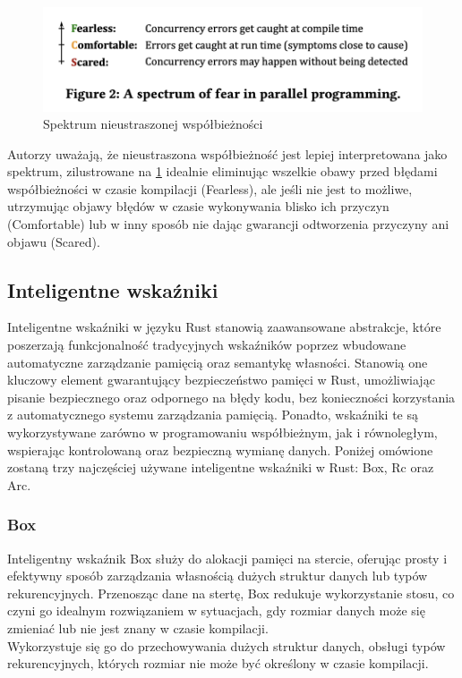 \begin{figure}[H]
    \centering
    \includegraphics[width=0.5\linewidth]{images/FearlesRustExplain.png}
    \caption{Spektrum nieustraszonej współbieżności \cite{WhenIsParallelismFearlessandZeroCostwithRust?}}
    \label{fig:FearlessSpectrum}
\end{figure}
Autorzy \cite{WhenIsParallelismFearlessandZeroCostwithRust?}
uważają, że nieustraszona współbieżność jest lepiej interpretowana jako spektrum, zilustrowane na \ref{fig:FearlessSpectrum} idealnie eliminując wszelkie obawy przed błędami współbieżności w czasie kompilacji (Fearless), ale jeśli nie jest to możliwe, utrzymując objawy błędów w czasie wykonywania blisko ich przyczyn (Comfortable) lub w inny sposób nie dając gwarancji odtworzenia przyczyny ani objawu (Scared).

\subsection{Inteligentne wskaźniki }
Inteligentne wskaźniki w języku Rust stanowią zaawansowane abstrakcje, które poszerzają funkcjonalność tradycyjnych wskaźników poprzez wbudowane automatyczne zarządzanie pamięcią oraz semantykę własności. Stanowią one kluczowy element gwarantujący bezpieczeństwo pamięci w Rust, umożliwiając pisanie bezpiecznego oraz odpornego na błędy kodu, bez konieczności korzystania z automatycznego systemu zarządzania pamięcią. Ponadto, wskaźniki te są wykorzystywane zarówno w programowaniu współbieżnym, jak i równoległym, wspierając kontrolowaną oraz bezpieczną wymianę danych. Poniżej omówione zostaną trzy najczęściej używane inteligentne wskaźniki w Rust: Box, Rc oraz Arc.

\subsubsection{Box}
\label{BOX}
Inteligentny wskaźnik Box służy do alokacji pamięci na stercie, oferując prosty i efektywny sposób zarządzania własnością dużych struktur danych lub typów rekurencyjnych. Przenosząc dane na stertę, Box redukuje wykorzystanie stosu, co czyni go idealnym rozwiązaniem w sytuacjach, gdy rozmiar danych może się zmieniać lub nie jest znany w czasie kompilacji.\\
Wykorzystuje się go do przechowywania dużych struktur danych, obsługi typów rekurencyjnych, których rozmiar nie może być określony w czasie kompilacji.

